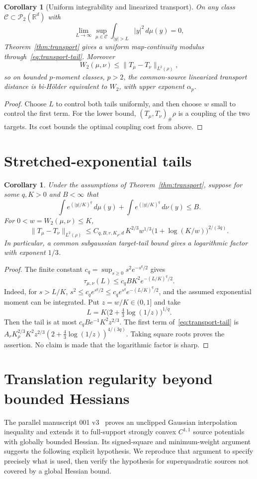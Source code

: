 \documentclass[11pt]{article}
\newtheorem{corollary}[theorem]{Corollary}
\theoremstyle{remark}\newtheorem{remark}[theorem]{Remark}
\newcommand{\R}{\mathbb R}\newcommand{\Var}{\operatorname{Var}}
\newcommand{\Ptwo}{\mathcal P_2}\newcommand{\TV}{\operatorname{TV}}
\newcommand{\norm}[1]{\lVert#1\rVert}\newcommand{\ind}{\mathbf 1}
\begin{document}
\begin{corollary}[Uniform integrability and linearized transport]
On any class $\mathcal C\subset\Ptwo(\R^d)$ with
\[
 \lim_{L\to\infty}\sup_{\mu\in\mathcal C}
                  \int_{|y|>L}|y|^2\,d\mu(y)=0,
\]
Theorem~\ref{thm:transport} gives a uniform map-continuity modulus through~\eqref{eq:transport-tail}. Moreover
\[
 W_2(\mu,\nu)\le\norm{T_\mu-T_\nu}_{L^2(\rho)},
\]
so on bounded $p$-moment classes, $p>2$, the common-source linearized transport distance is bi-H\"older equivalent to $W_2$, with upper exponent $\alpha_p$.
\end{corollary}
\begin{proof}
Choose $L$ to control both tails uniformly, and then choose $w$ small to control the first term. For the lower bound, $(T_\mu,T_\nu)_\#\rho$ is a coupling of the two targets. Its cost bounds the optimal coupling cost from above.
\end{proof}

\section{Stretched-exponential tails}
\begin{corollary}\label{cor:exponential}
Under the assumptions of Theorem~\ref{thm:transport}, suppose for some $q,K>0$ and $B<\infty$ that
\[
 \int e^{(|y|/K)^q}\,d\mu(y)+\int e^{(|y|/K)^q}\,d\nu(y)\le B.
\]
For $0<w=W_2(\mu,\nu)\le K$,
\[
 \norm{T_\mu-T_\nu}_{L^2(\rho)}
 \le C_{q,B,r,K_\rho,d}\,K^{2/3}w^{1/3}
                      \bigl(1+\log(K/w)\bigr)^{2/(3q)}.
\]
In particular, a common subgaussian target-tail bound gives a logarithmic factor with exponent $1/3$.
\end{corollary}
\begin{proof}
The finite constant $c_q=\sup_{s\ge0}s^2e^{-s^q/2}$ gives
\[
 \tau_{\mu,\nu}(L)\le c_q B K^2 e^{-(L/K)^q/2}.
\]
Indeed, for $s>L/K$, $s^2\le c_qe^{s^q/2}\le c_qe^{s^q}e^{-(L/K)^q/2}$, and the assumed exponential moment can be integrated. Put $z=w/K\in(0,1]$ and take
\[
 L=K\bigl(2+\tfrac43\log(1/z)\bigr)^{1/q}.
\]
Then the tail is at most $c_qB e^{-1}K^2z^{2/3}$. The first term of~\eqref{eq:transport-tail} is
$A_rK_\rho^{2/3}K^2z^{2/3}(2+\tfrac43\log(1/z))^{4/(3q)}$.
Taking square roots proves the assertion. No claim is made that the logarithmic factor is sharp.
\end{proof}

\section{Translation regularity beyond bounded Hessians}\label{sec:translation}
The parallel manuscript 001 v3~\cite{M001v3} proves an unclipped Gaussian interpolation inequality and extends it to full-support strongly convex $C^{1,1}$ source potentials with globally bounded Hessian. Its signed-square and minimum-weight argument suggests the following explicit hypothesis. We reproduce that argument to specify precisely what is used, then verify the hypothesis for superquadratic sources not covered by a global Hessian bound.
\end{document}
